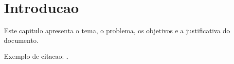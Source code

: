 \chapter{Introducao}

Este capitulo apresenta o tema, o problema, os objetivos e a justificativa do documento.

Exemplo de citacao: \cite{exemplo2024}.

